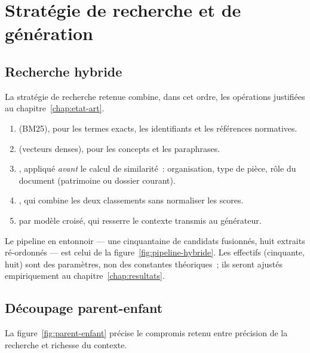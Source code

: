 \section{Stratégie de recherche et de génération}
\label{sec:ch2-recherche}

\subsection{Recherche hybride}

La stratégie de recherche retenue combine, dans cet ordre, les opérations
justifiées au chapitre~\ref{chap:etat-art}.

\begin{enumerate}
  \item {} (BM25), pour les termes exacts, les
        identifiants et les références normatives.
  \item {} (vecteurs denses), pour les concepts
        et les paraphrases.
  \item {}, appliqué \emph{avant} le calcul
        de similarité~: organisation, type de pièce, rôle du document
        (patrimoine ou dossier courant).
  \item {}, qui combine les deux
        classements sans normaliser les scores.
  \item {} par modèle croisé, qui resserre le
        contexte transmis au générateur.
\end{enumerate}

Le pipeline en entonnoir --- une cinquantaine de candidats fusionnés, huit
extraits ré-ordonnés --- est celui de la figure~\ref{fig:pipeline-hybride}.
Les effectifs (cinquante, huit) sont des paramètres, non des constantes
théoriques~; ils seront ajustés empiriquement au
chapitre~\ref{chap:resultats}.

\subsection{Découpage parent-enfant}

La figure~\ref{fig:parent-enfant} précise le compromis retenu entre
précision de la recherche et richesse du contexte.

